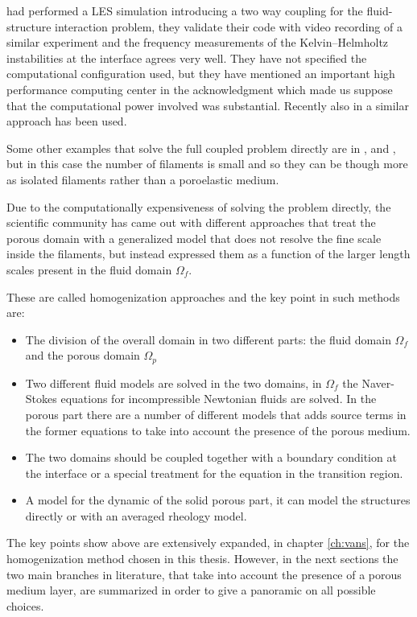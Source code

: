 \citet{dupont2010modelling} had performed a LES simulation introducing a two way coupling for the fluid-structure interaction problem, they validate their code with video recording of a similar experiment and the frequency measurements of the Kelvin–Helmholtz instabilities at the interface agrees very well.
They have not specified the computational configuration used, but they have mentioned an important high performance computing center in the acknowledgment which made us suppose that the computational power involved was substantial.
Recently also in \citet{marjoribanks2017does} a similar approach has been used.

Some other examples that solve the full coupled problem directly are in \citet{pinelli2017pelskin}, \citet{favier2017pelskin} and \citet{revell2017pelskin}, but in this case the number of filaments is small and so they can be though more as isolated filaments rather than a poroelastic medium.

Due to the computationally expensiveness of solving the problem directly, the scientific community has came out with different approaches that treat the porous domain with a generalized model that does not resolve the fine scale inside the filaments, but instead expressed them as a function of the larger length scales present in the fluid domain $\Omega_{f}$.

These are called homogenization approaches and the key point in such methods are:
\begin{itemize}
	\item The division of the overall domain in two different parts: the fluid domain $\Omega_{f}$ and the porous domain $\Omega_{p}$
	\item Two different fluid models are solved in the two domains, in $\Omega_{f}$ the Naver-Stokes equations for incompressible Newtonian fluids are solved. In the porous part there are a number of different models that adds source terms in the former equations to take into account the presence of the porous medium.
	\item The two domains should be coupled together with a boundary condition at the interface or a special treatment for the equation in the transition region.
	\item A model for the dynamic of the solid porous part, it can model the structures directly or with an averaged rheology model.
\end{itemize}

The key points show above are extensively expanded, in chapter \ref{ch:vans}, for the homogenization method chosen in this thesis.
However, in the next sections the two main branches in literature, that take into account the presence of a porous medium layer, are summarized in order to give a panoramic on all possible choices.


